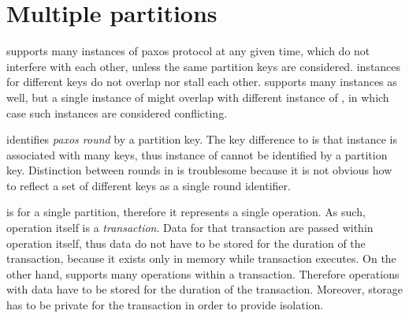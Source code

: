 
\section{Multiple partitions}\label{sec:mpp:requirements}

\lwt supports many instances of paxos protocol at any given time, which do not interfere with each other, unless the same partition keys are considered. \lwt instances for different keys do not overlap nor stall each other.
\mpt supports many instances as well, but a single instance of \mpt might overlap with different instance of \mpt, in which case such instances are considered conflicting. 

\lwt identifies \emph{paxos round} by a partition key. The key difference to \lwt is that \mpt instance is associated with many keys, thus instance of \mpt cannot be identified by a partition key. 
Distinction between \paxos rounds in \mpt is troublesome because it is not obvious how to reflect a set of different keys as a single round identifier.
\label{sec:mpp:requirements:identifyRound}

\lwt is for a single partition, therefore it represents a single operation. As such, operation itself is a
\emph{transaction}. Data for that transaction are passed within operation itself, thus data do not have to be stored
 for the duration of the transaction, because it exists only in memory while \lwt transaction executes.
On the other hand, \mpt supports many operations within a transaction. Therefore operations with data have to be stored for the duration of the transaction. Moreover, storage has to be private for the transaction in order to provide isolation.



